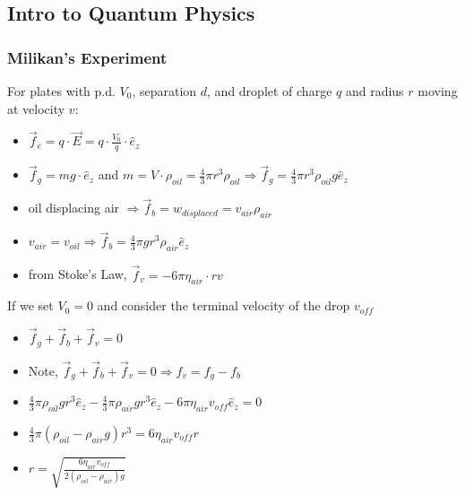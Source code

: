 \documentclass{article}
\begin{document}

\subsection{Intro to Quantum Physics}

\subsubsection*{Milikan's Experiment}
For plates with p.d. \(V_0\), separation \(d\),
and droplet of charge \(q\) and radius \(r\) moving at velocity \(v\):

\begin{itemize}
    \item \(\vec f_e = q\cdot\vec E = q\cdot\frac{V_0}{q}\cdot\hat e_z\)
    \item \(\vec f_g = mg\cdot\hat e_z\) and \(m=V\cdot \rho_{oil}=\frac{4}{3}\pi r^3\rho_{oil}\Rightarrow \vec f_g = \frac{4}{3}\pi r^3\rho_{oil} g\hat e_z \)
    \item oil displacing air \(\Rightarrow\vec f_b = w_{displaced}=v_{air}\rho_{air}\)
    \item \(v_{air} = v_{oil}\Rightarrow\vec f_b = \frac{4}{3}\pi g r^3\rho_{air}\hat e_z\)
    \item from Stoke's Law, \(\vec f_v = -6\pi\eta_{air}\cdot rv\)
\end{itemize}

If we set $V_0 = 0$ and consider the terminal velocity of the drop $v_{off}$
\begin{itemize}
    \item \(\vec f_g + \vec f_b + \vec f_v = 0\)
    \item Note, \(\vec f_g + \vec f_b + \vec f_v = 0 \Rightarrow f_v=f_g-f_b\)
    \item \(\frac{4}{3}\pi\rho_{oil}gr^3\hat e_z - \frac{4}{3}\pi\rho_{air}gr^3\hat e_z - 6\pi\eta_{air}v_{off}\hat e_z = 0\)
    \item \(\frac{4}{3}\pi(\rho_{oil}-\rho_{air}g)r^3=6\eta_{air}v_{off}r\)
    \item \(\boxed{r=\sqrt{\frac{6\eta_{air} v_{off}}{2(\rho_{oil}-\rho_{air})g}}}\)
\end{itemize}
\end{document}
